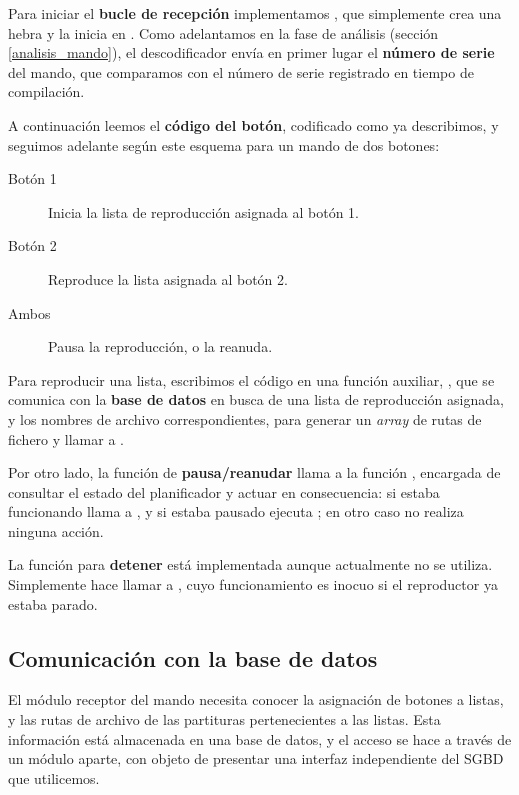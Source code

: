 Para iniciar el \textbf{bucle de recepción} implementamos , que simplemente crea una hebra y la inicia en . Como adelantamos en la fase de análisis (sección \ref{analisis_mando}), el descodificador envía en primer lugar el \textbf{número de serie} del mando, que comparamos con el número de serie registrado en tiempo de compilación. 

A continuación leemos el \textbf{código del botón}, codificado como ya describimos, y seguimos adelante según este esquema para un mando de dos botones:

\begin{description}
	\item[Botón 1] Inicia la lista de reproducción asignada al botón 1.
	\item[Botón 2] Reproduce la lista asignada al botón 2.
	\item[Ambos] Pausa la reproducción, o la reanuda.
\end{description}

Para reproducir una lista, escribimos el código en una función auxiliar, , que se comunica con la \textbf{base de datos} en busca de una lista de reproducción asignada, y los nombres de archivo correspondientes, para generar un \textit{array} de rutas de fichero y llamar a .

Por otro lado, la función de \textbf{pausa/reanudar} llama a la función , encargada de consultar el estado del planificador y actuar en consecuencia: si estaba funcionando llama a , y si estaba pausado ejecuta ; en otro caso no realiza ninguna acción.

La función para \textbf{detener} está implementada aunque actualmente no se utiliza. Simplemente hace llamar a , cuyo funcionamiento es inocuo si el reproductor ya estaba parado.

\subsection{Comunicación con la base de datos}

El módulo receptor del mando necesita conocer la asignación de botones a listas, y las rutas de archivo de las partituras pertenecientes a las listas. Esta información está almacenada en una base de datos, y el acceso se hace a través de un módulo aparte, con objeto de presentar una interfaz independiente del \acrshort{SGBD} que utilicemos.

